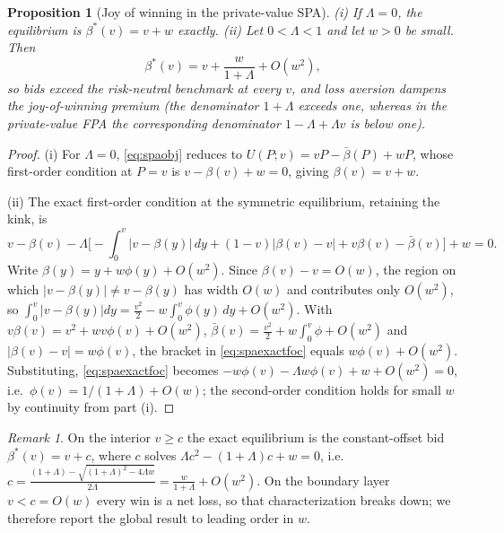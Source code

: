 \documentclass[11pt,a4paper]{article}
\newtheorem{proposition}{Proposition}
\theoremstyle{remark}
\newtheorem{remark}{Remark}
\begin{document}
\begin{proposition}[Joy of winning in the private-value SPA]
\label{prop:spa}
(i) If $\Lambda=0$, the equilibrium is $\beta^{*}(v)=v+w$ exactly. (ii) Let
$0<\Lambda<1$ and let $w>0$ be small. Then
\begin{equation}
\beta^{*}(v)=v+\frac{w}{1+\Lambda}+O(w^{2}),
\end{equation}
so bids exceed the risk-neutral benchmark at every $v$, and loss aversion
\emph{dampens} the joy-of-winning premium (the denominator $1+\Lambda$ exceeds one,
whereas in the private-value FPA the corresponding denominator $1-\Lambda+\Lambda v$
is below one).
\end{proposition}
\begin{proof}
(i) For $\Lambda=0$, \eqref{eq:spaobj} reduces to $U(P;v)=vP-\bar\beta(P)+wP$, whose
first-order condition at $P=v$ is $v-\beta(v)+w=0$, giving $\beta(v)=v+w$.

(ii) The exact first-order condition at the symmetric equilibrium, retaining the kink,
is
\begin{equation}
v-\beta(v)-\Lambda\Big[-\!\int_0^v\!|v-\beta(y)|\,dy+(1-v)\big|\beta(v)-v\big|
+v\beta(v)-\bar\beta(v)\Big]+w=0 .
\label{eq:spaexactfoc}
\end{equation}
Write $\beta(y)=y+w\phi(y)+O(w^{2})$. Since $\beta(v)-v=O(w)$, the region on which
$|v-\beta(y)|\neq v-\beta(y)$ has width $O(w)$ and contributes only $O(w^{2})$, so
$\int_0^v|v-\beta(y)|dy=\tfrac{v^{2}}{2}-w\int_0^v\phi(y)\,dy+O(w^{2})$. With
$v\beta(v)=v^{2}+wv\phi(v)+O(w^{2})$, $\bar\beta(v)=\tfrac{v^{2}}{2}+w\int_0^v\phi+O(w^{2})$
and $|\beta(v)-v|=w\phi(v)$, the bracket in \eqref{eq:spaexactfoc} equals
$w\phi(v)+O(w^{2})$. Substituting, \eqref{eq:spaexactfoc} becomes
$-w\phi(v)-\Lambda w\phi(v)+w+O(w^{2})=0$, i.e.\ $\phi(v)=1/(1+\Lambda)+O(w)$; the
second-order condition holds for small $w$ by continuity from part (i).
\end{proof}
\begin{remark}
On the interior $v\ge c$ the exact equilibrium is the constant-offset bid
$\beta^{*}(v)=v+c$, where $c$ solves $\Lambda c^{2}-(1+\Lambda)c+w=0$, i.e.
$c=\frac{(1+\Lambda)-\sqrt{(1+\Lambda)^{2}-4\Lambda w}}{2\Lambda}=\frac{w}{1+\Lambda}+O(w^{2})$.
On the boundary layer $v<c=O(w)$ every win is a net loss, so that characterization
breaks down; we therefore report the global result to leading order in $w$.
\end{remark}
\end{document}

